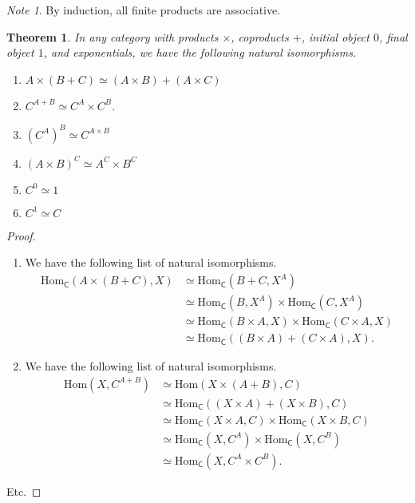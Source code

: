 \documentclass[a4paper]{report}
\newcommand{\Hom}{\mathrm{Hom}}
\theoremstyle{definition}
\theoremstyle{plain}
\newtheorem{theorem}{Theorem}[section]
\theoremstyle{remark}
\newtheorem{note}{Note}[section]
\begin{document}
\begin{note}
  By induction, all finite products are associative.
\end{note}

\begin{theorem}
  In any category with products $\times$, coproducts $+$, initial object $0$, final object $1$, and exponentials, we have the following natural isomorphisms.
  \begin{enumerate}
    \item $A \times (B + C) \simeq (A \times B) + (A \times C)$
    \item $C^{A + B} \simeq C^{A} \times C^{B}$.
    \item $(C^{A})^{B} \simeq C^{A \times B}$
    \item $(A \times B)^{C} \simeq A^{C} \times B^{C}$
    \item $C^{0} \simeq 1$
    \item $C^{1} \simeq C$
  \end{enumerate}
\end{theorem}
\begin{proof}
  $\,$
  \begin{enumerate}
    \item We have the following list of natural isomorphisms.
      \begin{align*}
        \Hom_{\mathsf{C}}(A \times (B + C), X) & \simeq \Hom_{\mathsf{C}}(B + C, X^{A}) \\
        & \simeq \Hom_{\mathsf{C}}(B, X^{A}) \times \Hom_{\mathsf{C}}(C, X^{A}) \\
        & \simeq \Hom_{\mathsf{C}}(B \times A, X) \times \Hom_{\mathsf{C}}(C \times A, X) \\
        & \simeq \Hom_{\mathsf{C}}((B \times A) + (C \times A), X).
      \end{align*}
    \item We have the following list of natural isomorphisms.
      \begin{align*}
        \Hom(X, C^{A + B}) & \simeq \Hom(X \times (A + B), C) \\
        & \simeq \Hom_{\mathsf{C}}((X \times A) + (X \times B), C) \\
        & \simeq \Hom_{\mathsf{C}}(X \times A, C) \times \Hom_{\mathsf{C}}(X \times B, C) \\
        & \simeq \Hom_{\mathsf{C}}(X, C^{A}) \times \Hom_{\mathsf{C}}(X, C^{B}) \\
        & \simeq \Hom_{\mathsf{C}}(X, C^{A} \times C^{B}).
      \end{align*}
  \end{enumerate}
  Etc.
\end{proof}
\end{document}
